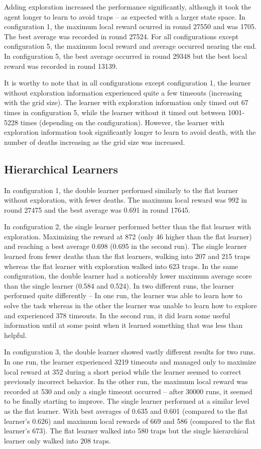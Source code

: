 \documentclass{article}
\begin{document}
	Adding exploration increased the performance significantly, although it took the agent longer to learn to avoid traps -- as expected with a larger state space. In configuration 1, the maximum local reward ocurred in round 27550 and was 1705. The best average was recorded in round 27524. For all configurations except configuration 5, the maximum local reward and average occurred nearing the end. In configuration 5, the best average occurred in round 29348 but the best local reward was recorded in round 13139.

	It is worthy to note that in all configurations except configuration 1, the learner without exploration information experienced quite a few timeouts (increasing with the grid size). The learner with exploration information only timed out 67 times in configuration 5, while the learner without it timed out between 1001-5228 times (depending on the configuration). However, the learner with exploration information took significantly longer to learn to avoid death, with the number of deaths increasing as the grid size was increased.

	\subsection{Hierarchical Learners}
	\label{s:res:meta}
	In configuration 1, the double learner performed similarly to the flat learner without exploration, with fewer deaths. The maximum local reward was 992 in round 27475 and the best average was 0.691 in round 17645. 
	
	In configuration 2, the single learner performed better than the flat learner with exploration. Maximizing the reward at 872 (only 46 higher than the flat learner) and reaching a best average 0.698 (0.695 in the second run). The single learner learned from fewer deaths than the flat learners, walking into 207 and 215 traps whereas the flat learner with exploration walked into 623 traps. 
	In the same configuration, the double learner had a noticeably lower maximum average score than the single learner (0.584 and 0.524). In two different runs, the learner performed quite differently -- In one run, the learner was able to learn how to solve the task whereas in the other the learner was unable to learn how to explore and experienced 378 timeouts. In the second run, it did learn some useful information until at some point when it learned something that was less than helpful.

	In configuration 3, the double learner showed vastly different results for two runs. In one run, the learner experienced 3219 timeouts and managed only to maximize local reward at 352 during a short period while the learner seemed to correct previously incorrect behavior. In the other run, the maximum local reward was recorded at 530 and only a single timeout occurred -- after 30000 runs, it seemed to be finally starting to improve. 
	The single learner performed at a similar level as the flat learner. With best averages of 0.635 and 0.601 (compared to the flat learner's 0.626) and maximum local rewards of 669 and 586 (compared to the flat learner's 673). The flat learner walked into 580 traps but the single hierarchical learner only walked into 208 traps.
\end{document}
